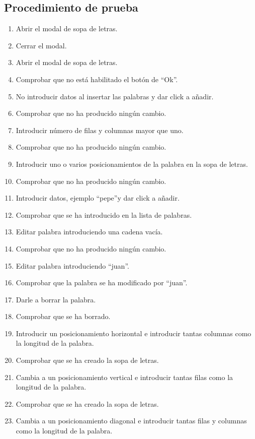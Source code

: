 \subsection{Procedimiento de prueba}
\label{procedimientoPruebas:sopa}
\begin{enumerate}
    \item Abrir el modal de sopa de letras.
    \item Cerrar el modal.
    \item Abrir el modal de sopa de letras.
    \item Comprobar que no está habilitado el botón de ``Ok''.
    \item No introducir datos al insertar las palabras y dar click a añadir.
    \item Comprobar que no ha producido ningún cambio.
    \item Introducir número de filas y columnas mayor que uno.
    \item Comprobar que no ha producido ningún cambio.
    \item Introducir uno o varios posicionamientos de la palabra en la sopa de letras.
    \item Comprobar que no ha producido ningún cambio.
    \item Introducir datos, ejemplo ``pepe''y dar click a añadir.
    \item Comprobar que se ha introducido en la lista de palabras.
    \item Editar palabra introduciendo una cadena vacía.
    \item Comprobar que no ha producido ningún cambio.
    \item Editar palabra introduciendo ``juan''.
    \item Comprobar que la palabra se ha modificado por ``juan''.
    \item Darle a borrar la palabra.
    \item Comprobar que se ha borrado.
    \item Introducir un posicionamiento horizontal e introducir tantas columnas como la longitud de la palabra.
    \item Comprobar que se ha creado la sopa de letras.
    \item Cambia a un posicionamiento vertical e introducir tantas filas como la longitud de la palabra.
    \item Comprobar que se ha creado la sopa de letras.
    \item Cambia a un posicionamiento diagonal e introducir tantas filas y columnas como la longitud de la palabra.

\end{enumerate}
